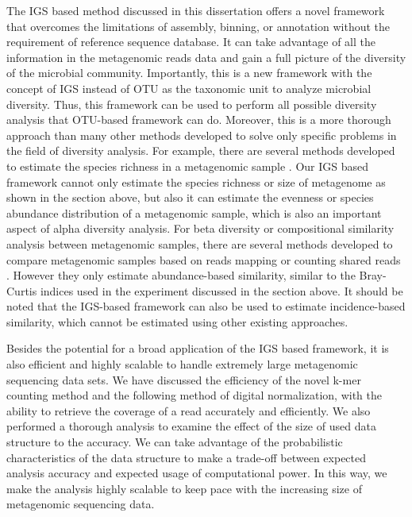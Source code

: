 The IGS based
method discussed in this dissertation offers a novel framework that
overcomes the limitations of assembly, binning, or annotation without the
requirement of reference sequence database. It can take advantage of all the 
information in the metagenomic reads data and gain a full picture of the
diversity of the microbial community. Importantly, this is a new
framework with the concept of IGS instead of OTU as the taxonomic unit to
analyze microbial diversity. Thus, this framework can be used to perform all possible
diversity analysis that OTU-based framework can do. Moreover, this is a more thorough
approach than many other methods developed to solve only specific
problems in the field of diversity analysis. For example, there are several
methods developed to estimate the species richness in a metagenomic sample 
\cite{Rodriguez-R2014}. Our IGS based framework cannot only
estimate the species richness or size of metagenome as shown in the section above, but
also it can estimate the evenness or species abundance distribution of a
metagenomic sample, which is also an important aspect of alpha diversity
analysis. For beta diversity or compositional similarity analysis between
metagenomic samples, there are several methods developed to compare metagenomic
samples based on reads mapping or counting shared reads \cite{Rodriguez-R:2013aa}.
However they only estimate abundance-based similarity, similar to
the Bray-Curtis indices used in the experiment discussed in the section above.
It should be noted that the 
IGS-based framework can also be used to estimate incidence-based similarity, 
which cannot be estimated using other existing approaches.


Besides the potential for a broad application of the IGS based framework, 
it is also efficient and
highly scalable to handle extremely large metagenomic sequencing data
sets. We have discussed the efficiency of the novel k-mer counting method and
the following method of digital normalization, with the ability to retrieve the
coverage of a read accurately and efficiently. We also performed a thorough analysis
to examine the effect of the size of used data structure to the accuracy. We can take
advantage of the probabilistic characteristics of the data structure to make a
trade-off between expected analysis accuracy and expected usage of
computational power. In this way, we make the analysis highly scalable to keep
pace with the increasing size of metagenomic sequencing data.  

